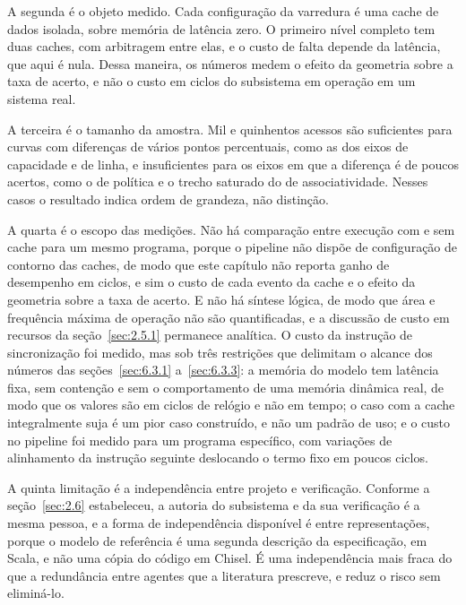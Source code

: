 A segunda é o objeto medido. Cada configuração da varredura é uma cache de dados isolada, sobre memória de latência zero. O primeiro nível completo tem duas caches, com arbitragem entre elas, e o custo de falta depende da latência, que aqui é nula. Dessa maneira, os números medem o efeito da geometria sobre a taxa de acerto, e não o custo em ciclos do subsistema em operação em um sistema real.

A terceira é o tamanho da amostra. Mil e quinhentos acessos são suficientes para curvas com diferenças de vários pontos percentuais, como as dos eixos de capacidade e de linha, e insuficientes para os eixos em que a diferença é de poucos acertos, como o de política e o trecho saturado do de associatividade. Nesses casos o resultado indica ordem de grandeza, não distinção.

A quarta é o escopo das medições. Não há comparação entre execução com e sem cache para um mesmo programa, porque o pipeline não dispõe de configuração de contorno das caches, de modo que este capítulo não reporta ganho de desempenho em ciclos, e sim o custo de cada evento da cache e o efeito da geometria sobre a taxa de acerto. E não há síntese lógica, de modo que área e frequência máxima de operação não são quantificadas, e a discussão de custo em recursos da seção~\ref{sec:2.5.1} permanece analítica. O custo da instrução de sincronização foi medido, mas sob três restrições que delimitam o alcance dos números das seções~\ref{sec:6.3.1} a~\ref{sec:6.3.3}: a memória do modelo tem latência fixa, sem contenção e sem o comportamento de uma memória dinâmica real, de modo que os valores são em ciclos de relógio e não em tempo; o caso com a cache integralmente suja é um pior caso construído, e não um padrão de uso; e o custo no pipeline foi medido para um programa específico, com variações de alinhamento da instrução seguinte deslocando o termo fixo em poucos ciclos.

A quinta limitação é a independência entre projeto e verificação. Conforme a seção~\ref{sec:2.6} estabeleceu, a autoria do subsistema e da sua verificação é a mesma pessoa, e a forma de independência disponível é entre representações, porque o modelo de referência é uma segunda descrição da especificação, em Scala, e não uma cópia do código em Chisel. É uma independência mais fraca do que a redundância entre agentes que a literatura prescreve, e reduz o risco sem eliminá-lo.
